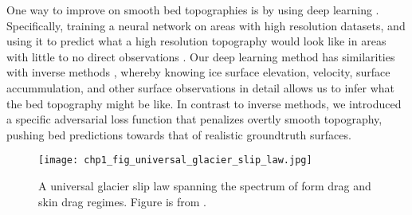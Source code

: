 One way to improve on smooth bed topographies is by using deep learning \citep[see][for a review]{GoodfellowDeeplearning2016}.
Specifically, training a neural network on areas with high resolution datasets, and using it to predict what a high resolution topography would look like in areas with little to no direct observations \citep[Chp.~\ref{ch:2},][]{LeongDeepBedMapdeepneural2020}.
Our deep learning method has similarities with inverse methods \citep{GudmundssonInverseMethodsGlaciology2011}, whereby knowing ice surface elevation, velocity, surface accummulation, and other surface observations in detail allows us to infer what the bed topography might be like.
In contrast to inverse methods, we introduced a specific adversarial loss function \citep{GoodfellowGenerativeAdversarialNetworks2014} that penalizes overtly smooth topography, pushing bed predictions towards that of realistic groundtruth surfaces.

\begin{figure}[htbp]
  \texttt{[image: chp1\_fig\_universal\_glacier\_slip\_law.jpg]}
  \caption[Universal glacier slip law]{
    A universal glacier slip law spanning the spectrum of form drag and skin drag regimes.
    Figure is from \citet{Minchewuniversalglacierslip2020}.
  }
  \label{fig:1.3}
\end{figure}

